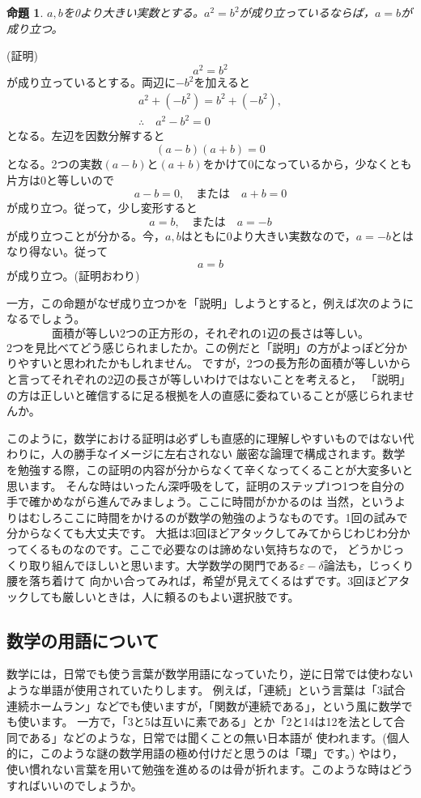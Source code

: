 \documentclass[./main]{subfiles}
\newtheorem{thm}{命題}
\begin{document}
\begin{thm}
$a,b$を0より大きい実数とする。$a^2 = b^2$が成り立っているならば，$a = b$が成り立つ。
\end{thm}

(証明)
\[a^2 = b^2 \]
が成り立っているとする。両辺に$-b^2$を加えると
\begin{gather*}
a^2 + (-b^2) = b^2 + (-b^2), \\
\therefore \quad a^2 - b^2 = 0
\end{gather*}
となる。左辺を因数分解すると
\[
(a-b)(a+b) = 0
\]
となる。2つの実数$(a-b)と(a+b)$をかけて0になっているから，少なくとも片方は0と等しいので
\[
a-b=0, \quad または\quad a+b=0
\]
が成り立つ。従って，少し変形すると
\[
a=b, \quad または \quad a=-b
\]
が成り立つことが分かる。今，$a,b$はともに0より大きい実数なので，$a=-b$とはなり得ない。従って
\[
a=b
\]
が成り立つ。(証明おわり)

一方，この命題がなぜ成り立つかを「説明」しようとすると，例えば次のようになるでしょう。
\[
面積が等しい2つの正方形の，それぞれの1辺の長さは等しい。
\]
2つを見比べてどう感じられましたか。この例だと「説明」の方がよっぽど分かりやすいと思われたかもしれません。
ですが，2つの\.{長}\.{方}\.{形}の面積が等しいからと言ってそれぞれの2辺の長さが等しいわけではないことを考えると，
「説明」の方は正しいと確信するに足る根拠を人の直感に委ねていることが感じられませんか。

このように，数学における証明は必ずしも直感的に理解しやすいものではない代わりに，人の勝手なイメージに左右されない
厳密な論理で構成されます。数学を勉強する際，この証明の内容が分からなくて辛くなってくることが大変多いと思います。
そんな時はいったん深呼吸をして，証明のステップ1つ1つを自分の手で確かめながら進んでみましょう。ここに時間がかかるのは
当然，というよりはむしろここに時間をかけるのが数学の勉強のようなものです。1回の試みで分からなくても大丈夫です。
大抵は3回ほどアタックしてみてからじわじわ分かってくるものなのです。ここで必要なのは諦めない気持ちなので，
どうかじっくり取り組んでほしいと思います。大学数学の関門である$\varepsilon-\delta$論法も，じっくり腰を落ち着けて
向かい合ってみれば，希望が見えてくるはずです。3回ほどアタックしても厳しいときは，人に頼るのもよい選択肢です。

\subsection{数学の用語について}

数学には，日常でも使う言葉が数学用語になっていたり，逆に日常では使わないような単語が使用されていたりします。
例えば，「連続」という言葉は「3試合連続ホームラン」などでも使いますが，「関数が連続である」，という風に数学でも使います。
一方で，「3と5は互いに素である」とか「2と14は12を法として合同である」などのような，日常では聞くことの無い日本語が
使われます。(個人的に，このような謎の数学用語の極め付けだと思うのは「環」です。)
やはり，使い慣れない言葉を用いて勉強を進めるのは骨が折れます。このような時はどうすればいいのでしょうか。
\end{document}
